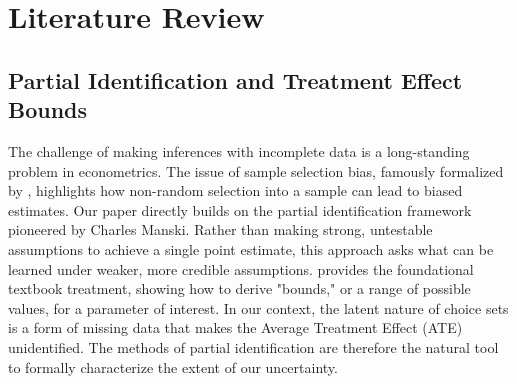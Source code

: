 \section{Literature Review}\label{sec:lit_review}


\subsection{Partial Identification and Treatment Effect Bounds}
The challenge of making inferences with incomplete data is a long-standing problem in econometrics. The issue of sample selection bias, famously formalized by \citet{Heckman1979}, highlights how non-random selection into a sample can lead to biased estimates.
Our paper directly builds on the partial identification framework pioneered by Charles Manski. Rather than making strong, untestable assumptions to achieve a single point estimate, this approach asks what can be learned under weaker, more credible assumptions. \citet{Manski2003} provides the foundational textbook treatment, showing how to derive "bounds," or a range of possible values, for a parameter of interest.
In our context, the latent nature of choice sets is a form of missing data that makes the Average Treatment Effect (ATE) unidentified. The methods of partial identification are therefore the natural tool to formally characterize the extent of our uncertainty.

